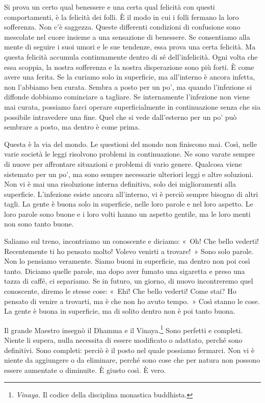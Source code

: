 Si prova un certo qual benessere e una certa qual felicità con questi
comportamenti, è la felicità dei folli. È il modo in cui i folli fermano
la loro sofferenza. Non c'è saggezza. Queste differenti condizioni di
confusione sono mescolate nel cuore insieme a una sensazione di
benessere. Se consentiamo alla mente di seguire i suoi umori e le sue
tendenze, essa prova una certa felicità. Ma questa felicità accumula
continuamente dentro di sé dell'infelicità. Ogni volta che essa scoppia,
la nostra sofferenza e la nostra disperazione sono più forti. È come
avere una ferita. Se la curiamo solo in superficie, ma all'interno è
ancora infetta, non l'abbiamo ben curata. Sembra a posto per un po', ma
quando l'infezione si diffonde dobbiamo cominciare a tagliare. Se
internamente l'infezione non viene mai curata, possiamo farci operare
superficialmente in continuazione senza che sia possibile intravedere
una fine. Quel che si vede dall'esterno per un po' può sembrare a posto,
ma dentro è come prima.

Questa è la via del mondo. Le questioni del mondo non finiscono mai.
Così, nelle varie società le leggi risolvono problemi in continuazione.
Ne sono varate sempre di nuove per affrontare situazioni e problemi di
vario genere. Qualcosa viene sistemato per un po', ma sono sempre
necessarie ulteriori leggi e altre soluzioni. Non vi è mai una
risoluzione interna definitiva, solo dei miglioramenti alla superficie.
L'infezione esiste ancora all'interno, vi è perciò sempre bisogno di
altri tagli. La gente è buona solo in superficie, nelle loro parole e
nel loro aspetto. Le loro parole sono buone e i loro volti hanno un
aspetto gentile, ma le loro menti non sono tanto buone.

Saliamo sul treno, incontriamo un conoscente e diciamo: «~Oh! Che bello
vederti! Recentemente ti ho pensato molto! Volevo venirti a trovare!~»
Sono solo parole. Non lo pensiamo veramente. Siamo buoni in superficie,
ma dentro non poi così tanto. Diciamo quelle parole, ma dopo aver fumato
una sigaretta e preso una tazza di caffé, ci separiamo. Se in futuro, un
giorno, di nuovo incontreremo quel conoscente, diremo le stesse cose:
«~Ehi! Che bello vederti! Come stai? Ho pensato di venire a trovarti, ma
è che non ho avuto tempo.~» Così stanno le cose. La gente è buona in
superficie, ma di solito dentro non è poi tanto buona.

Il grande Maestro insegnò il Dhamma e il Vinaya.\footnote{%
  \emph{Vinaya.} Il codice della disciplina monastica buddhista.}
Sono perfetti e
completi. Niente li supera, nulla necessita di essere modificato o
adattato, perché sono definitivi. Sono completi: perciò è il posto nel
quale possiamo fermarci. Non vi è niente da aggiungere o da eliminare,
perché sono cose che per natura non possono essere aumentate o
diminuite. È giusto così. È vero.

